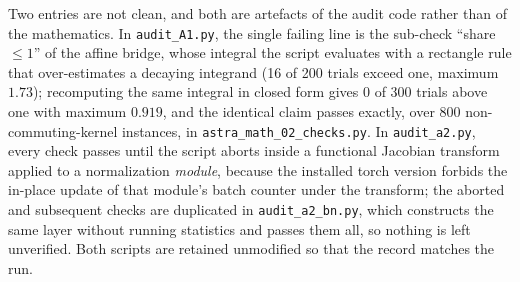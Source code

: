 Two entries are not clean, and both are artefacts of the audit code rather
than of the mathematics. In \texttt{audit\_A1.py}, the single failing line
is the sub-check ``share $\leq 1$'' of the affine bridge, whose integral the
script evaluates with a rectangle rule that over-estimates a decaying
integrand (16 of 200 trials exceed one, maximum $1.73$); recomputing the
same integral in closed form gives $0$ of $300$ trials above one with
maximum $0.919$, and the identical claim passes exactly, over $800$
non-commuting-kernel instances, in \texttt{astra\_math\_02\_checks.py}. In
\texttt{audit\_a2.py}, every check passes until the script aborts inside a
functional Jacobian transform applied to a normalization \emph{module},
because the installed torch version forbids the in-place update of that
module's batch counter under the transform; the aborted and subsequent
checks are duplicated in \texttt{audit\_a2\_bn.py}, which constructs the
same layer without running statistics and passes them all, so nothing is
left unverified. Both scripts are retained unmodified so that the record
matches the run.
